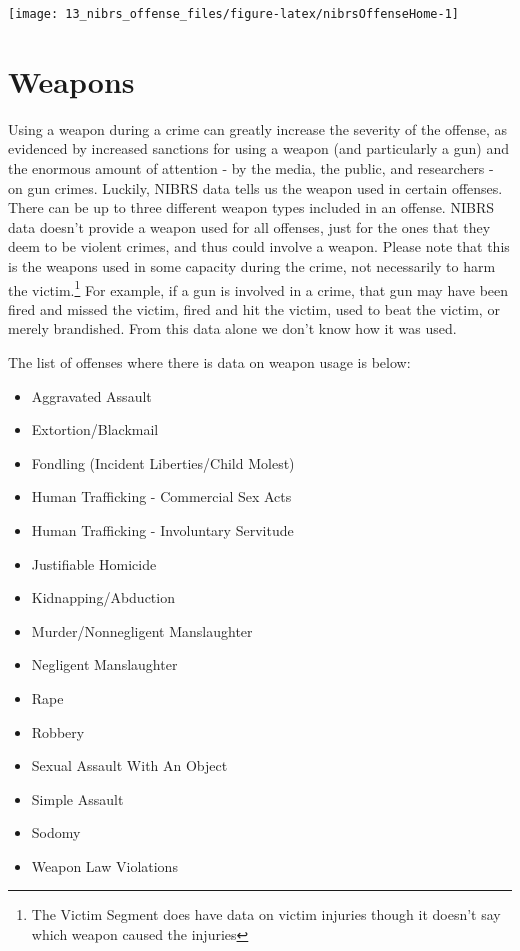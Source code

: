 \documentclass[
]{krantz}
\providecommand{\tightlist}{%
  \setlength{\itemsep}{0pt}\setlength{\parskip}{0pt}}
\let\origfigure\figure
\let\endorigfigure\endfigure
\renewenvironment{figure}[1][2] {
    \expandafter\origfigure\expandafter[H]
} {
    \endorigfigure
}
\begin{document}
\begin{figure}

{\centering \texttt{[image: 13\_nibrs\_offense\_files/figure-latex/nibrsOffenseHome-1]} 

}

\caption{The annual percent of offenses reported as occuring at the victim's home, 1991-2022.}\label{fig:nibrsOffenseHome}
\end{figure}

\section{Weapons}\label{offenseWeapons}

Using a weapon during a crime can greatly increase the
severity of the offense, as evidenced by increased sanctions
for using a weapon (and particularly a gun) and the enormous
amount of attention - by the media, the public, and
researchers - on gun crimes. Luckily, NIBRS data tells us
the weapon used in certain offenses. There can be up to
three different weapon types included in an offense. NIBRS
data doesn't provide a weapon used for all offenses, just
for the ones that they deem to be violent crimes, and thus
could involve a weapon. Please note that this is the weapons
used in some capacity during the crime, not necessarily to
harm the victim.\footnote{The Victim Segment does have data
  on victim injuries though it doesn't say which weapon
  caused the injuries} For example, if a gun is involved in
a crime, that gun may have been fired and missed the victim,
fired and hit the victim, used to beat the victim, or merely
brandished. From this data alone we don't know how it was
used.

The list of offenses where there is data on weapon usage is
below:

\begin{itemize}
\tightlist
\item
  Aggravated Assault
\item
  Extortion/Blackmail
\item
  Fondling (Incident Liberties/Child Molest)
\item
  Human Trafficking - Commercial Sex Acts
\item
  Human Trafficking - Involuntary Servitude
\item
  Justifiable Homicide
\item
  Kidnapping/Abduction
\item
  Murder/Nonnegligent Manslaughter
\item
  Negligent Manslaughter
\item
  Rape
\item
  Robbery
\item
  Sexual Assault With An Object
\item
  Simple Assault
\item
  Sodomy
\item
  Weapon Law Violations
\end{itemize}
\end{document}

